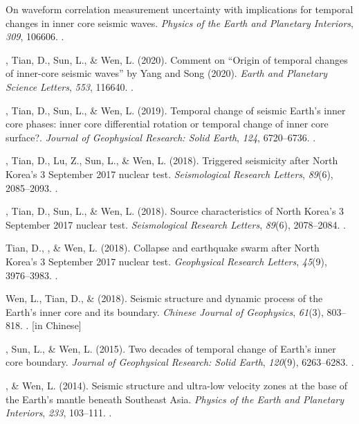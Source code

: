 \begin{etaremune}
    On waveform correlation measurement uncertainty with implications for temporal changes in inner core seismic waves.
    \textit{Physics of the Earth and Planetary Interiors}, \textit{309}, 106606.
    .
\item
    \Yao\CS, Tian, D., Sun, L., \& Wen, L. (2020).
    Comment on “Origin of temporal changes of inner-core seismic waves” by Yang and Song (2020).
    \textit{Earth and Planetary Science Letters}, \textit{553}, 116640.
    .
\item
    \Yao\CS, Tian, D., Sun, L., \& Wen, L. (2019).
    Temporal change of seismic Earth's inner core phases: inner core differential rotation or temporal change of inner core surface?.
    \textit{Journal of Geophysical Research: Solid Earth}, \textit{124}, 6720--6736.
    .
\item
    \Yao\CS, Tian, D., Lu, Z., Sun, L., \& Wen, L. (2018).
    Triggered seismicity after North Korea's 3 September 2017 nuclear test.
    \textit{Seismological Research Letters}, \textit{89}(6), 2085--2093.
    .
\item
    \Yao\CS, Tian, D., Sun, L., \& Wen, L. (2018).
	Source characteristics of North Korea's 3 September 2017 nuclear test.
    \textit{Seismological Research Letters}, \textit{89}(6), 2078--2084.
    .
\item
    Tian, D., \Yao\CF, \& Wen, L. (2018).
    Collapse and earthquake swarm after North Korea's 3 September 2017 nuclear test.
    \textit{Geophysical Research Letters}, \textit{45}(9), 3976--3983.
    .
\item
    Wen, L., Tian, D., \& \Yao (2018).
    Seismic structure and dynamic process of the Earth's inner core and its boundary.
    \textit{Chinese Journal of Geophysics}, \textit{61}(3), 803--818.
    . [in Chinese]
\item
    \Yao\CS, Sun, L., \& Wen, L. (2015).
    Two decades of temporal change of Earth's inner core boundary.
    \textit{Journal of Geophysical Research: Solid Earth}, \textit{120}(9), 6263--6283.
    .
\item
    \Yao\CS, \& Wen, L. (2014).
    Seismic structure and ultra-low velocity zones at the base of the Earth's mantle beneath Southeast Asia.
    \textit{Physics of the Earth and Planetary Interiors}, \textit{233}, 103--111.
    .
\end{etaremune}


